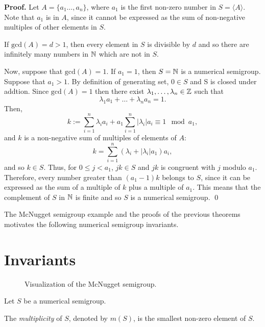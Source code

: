 \textbf{Proof. } Let $A = \{a_{1} \ldots, a_{n}\}$, where $a_1$ is the first non-zero number in $S = \langle A \rangle$. Note that $a_1$ is in $A$, since it cannot be expressed as the sum of non-negative multiples of other elements in $S$. \par
If $\text{gcd}(A) = d > 1$, then every element in $S$ is divisible by $d$ and so there are infinitely many numbers in $\mathbb{N}$ which are not in $S$. \par
Now, suppose that $\text{gcd}(A) = 1$. If $a_1 = 1$, then $S = \mathbb{N}$ is a numerical semigroup. Suppose that $a_1 > 1$. By definition of generating set, $0 \in S$ and S is closed under addtion. Since $\text{gcd}(A) = 1$ then there exist $\lambda_1, \ldots, \lambda_n \in \mathbb{Z}$ such that 
\[\lambda_1a_1 + \ldots + \lambda_na_n = 1.\]
Then, 
\[
    k := \sum_{i = 1}^n \lambda_ia_i + a_1\sum_{i = 1}^n|\lambda_i|a_i \equiv 1 \mod a_1,
\]
and $k$ is a non-negative sum of multiples of elements of $A$: 
\[k = \sum_{i = 1}^n (\lambda_i + |\lambda_i|a_1)a_i,\]
and so $k \in S$. Thus, for $0 \leq j < a_1$, $jk \in S$ and $jk$ is congruent with $j$ modulo $a_1$. Therefore, every number greater than $(a_1 - 1)k$ belongs to $S$, since it can be expressed as the sum of a multiple of $k$ plus a multiple of $a_1$.  This means that the complement of $S$ in $\mathbb{N}$ is finite and so $S$ is a numerical semigroup. \qed \par

The McNugget semigroup example and the proofs of the previous theorems motivates the following numerical semigroup invariants. \par 

\section{Invariants}\label{sec:smgps:invariants}

\begin{figure}
    \centering
    
    \caption{Visualization of the McNugget semigroup.}
    \label{fig:smgps:mcnugget}
\end{figure}

Let $S$ be a numerical semigroup. \par

\begin{definition}\label{def:smgps:multiplicity}
    The \textit{multiplicity} of $S$, denoted by $m(S)$, is the smallest non-zero element of $S$.
\end{definition}

